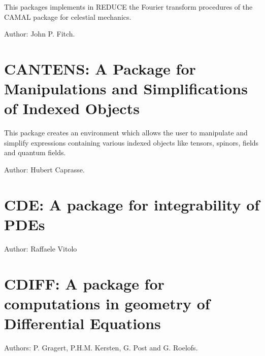 This packages implements in REDUCE the Fourier transform procedures of the
CAMAL package for celestial mechanics.

Author: John P. Fitch.


\newpage

\section{CANTENS: A Package for Manipulations 
and Simplifications of Indexed Objects}


This package creates an environment which allows the user to
manipulate and simplify expressions containing various indexed objects
like tensors, spinors, fields and quantum fields.

Author: Hubert Caprasse.


\newpage

\section{CDE: A package for integrability of PDEs}

Author: Raffaele Vitolo


\newpage

\section{CDIFF: A package for computations in geometry
  of Differential Equations}
\label{CDIFF}


Authors: P. Gragert, P.H.M. Kersten, G. Post and G. Roelofs.


\newpage




